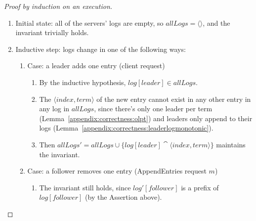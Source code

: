 \begin{proof}[Proof by induction on an execution]\
\begin{enumerate}
\item Initial state: all of the servers' logs are empty, so $allLogs =
{\langle \rangle}$, and the invariant trivially holds.
\item Inductive step: logs change in one of the following ways:
\begin{enumerate}
\item Case: a leader adds one entry (client request)
\begin{enumerate}
\item By the inductive hypothesis, $log[leader] \in allLogs$.
\item The $\langle index, term \rangle$ of the new entry cannot exist
in any other entry in any log in $allLogs$,
since there's only one leader per term
(Lemma~\ref{appendix:correctness:olpt}) and leaders
only append to their logs
(Lemma~\ref{appendix:correctness:leaderlogmonotonic}).
\item Then $allLogs' = allLogs \cup \{log[leader] \cat \langle index, term
\rangle\}$ maintains the invariant.
\end{enumerate}

\item Case: a follower removes one entry (AppendEntries request $m$)
\begin{enumerate}
\item The invariant still holds, since $log'[follower]$ is a
prefix of $log[follower]$ (by the Assertion above).
\end{enumerate}


\end{enumerate}
\end{enumerate}
\end{proof}

